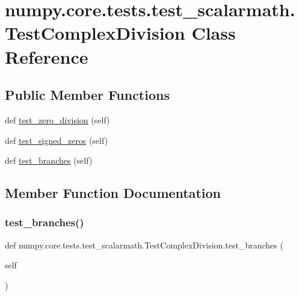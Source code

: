 \hypertarget{classnumpy_1_1core_1_1tests_1_1test__scalarmath_1_1TestComplexDivision}{}\section{numpy.\+core.\+tests.\+test\+\_\+scalarmath.\+Test\+Complex\+Division Class Reference}
\label{classnumpy_1_1core_1_1tests_1_1test__scalarmath_1_1TestComplexDivision}
\subsection*{Public Member Functions}
\begin{DoxyCompactItemize}
\item 
def \hyperlink{classnumpy_1_1core_1_1tests_1_1test__scalarmath_1_1TestComplexDivision_a9f6e1060612120a1b16fa1f1771533da}{test\+\_\+zero\+\_\+division} (self)
\item 
def \hyperlink{classnumpy_1_1core_1_1tests_1_1test__scalarmath_1_1TestComplexDivision_af86027c47806826bc1c3527573b4ff34}{test\+\_\+signed\+\_\+zeros} (self)
\item 
def \hyperlink{classnumpy_1_1core_1_1tests_1_1test__scalarmath_1_1TestComplexDivision_ae283a57a351c1aa9ab1d52db66b64bda}{test\+\_\+branches} (self)
\end{DoxyCompactItemize}


\subsection{Member Function Documentation}
\mbox{\label{classnumpy_1_1core_1_1tests_1_1test__scalarmath_1_1TestComplexDivision_ae283a57a351c1aa9ab1d52db66b64bda}} 
\subsubsection{\texorpdfstring{test\+\_\+branches()}{test\_branches()}}
{\footnotesize\ttfamily def numpy.\+core.\+tests.\+test\+\_\+scalarmath.\+Test\+Complex\+Division.\+test\+\_\+branches (\begin{DoxyParamCaption}\item[{}]{self }\end{DoxyParamCaption})}

